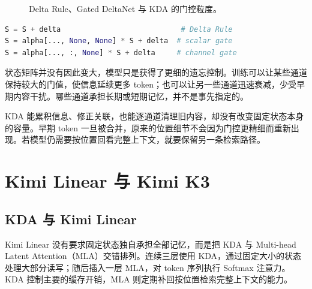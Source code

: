 \begin{figure}[htbp]
\centering
{}
\caption{Delta Rule、Gated DeltaNet 与 KDA 的门控粒度。}
\label{fig:ch02-kda-evolution}
\end{figure}

\begin{lstlisting}[language=Python,caption={三种状态更新在实现上的差别}]
S = S + delta                            # Delta Rule
S = alpha[..., None, None] * S + delta  # scalar gate
S = alpha[..., :, None] * S + delta     # channel gate
\end{lstlisting}

状态矩阵并没有因此变大，模型只是获得了更细的遗忘控制。训练可以让某些通道保持较大的门值，使信息延续更多 token；也可以让另一些通道迅速衰减，少受早期内容干扰。哪些通道承担长期或短期记忆，并不是事先指定的。

KDA 能累积信息、修正关联，也能逐通道清理旧内容，却没有改变固定状态本身的容量。早期 token 一旦被合并，原来的位置细节不会因为门控更精细而重新出现。若模型仍需要按位置回看完整上下文，就要保留另一条检索路径。

\section{Kimi Linear 与 Kimi K3}

\subsection{KDA 与 Kimi Linear}

Kimi Linear 没有要求固定状态独自承担全部记忆，而是把 KDA 与 Multi-head Latent Attention（MLA）交错排列。连续三层使用 KDA，通过固定大小的状态处理大部分读写；随后插入一层 MLA，对 token 序列执行 Softmax 注意力。KDA 控制主要的缓存开销，MLA 则定期补回按位置检索完整上下文的能力。

